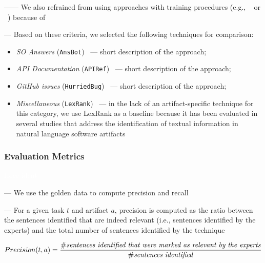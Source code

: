 ------ We also refrained from using approaches with training procedures (e.g., ~\cite{liu2020} or ~\cite{Treude2016}) because of ~\cite{Chaparro2017, fucci2019} \vspace{3mm}


--- Based on these criteria, we selected the following techniques for comparison:


\begin{itemize}[leftmargin=\parindent, font=\normalfont\itshape]
    \item \textit{SO Answers} (\texttt{AnsBot})~\cite{Xu2017} --- short description of the approach;
    
    \item \textit{API Documentation} (\texttt{APIRef})~\cite{Robillard2015} --- short description of the approach;
    
    \item \textit{GitHub issues} (\texttt{HurriedBug})~\cite{Lotufo2012} --- short description of the approach;

    \item \textit{Miscellaneous} (\texttt{LexRank})~\cite{Erkan2004} --- in the lack of an artifact-specific technique for this category, we use LexRank as a baseline because it has been evaluated in several studies that address the identification of textual information in natural language software artifacts~\cite{nadi2020, Ponzanelli2017}
\end{itemize}






\subsubsection{Evaluation Metrics}
\textcolor{white}{force ident} %

--- We use the golden data to compute precision and recall


--- For a given task $t$ and artifact $a$, precision is computed as the ratio between the sentences identified that are indeed relevant (i.e., sentences identified by the experts) and the total number of sentences identified by the technique


\begin{equation}
    Precision(t, a) = \frac{\# \text{\textit{sentences identified that were marked as relevant by the experts}}}{\# \text{\textit{sentences identified}}}
\end{equation}

